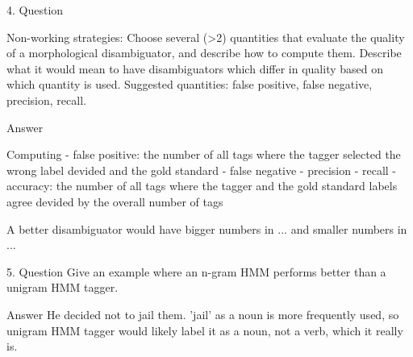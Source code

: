  
 4. Question

Non-working strategies:
Choose several (>2) quantities that evaluate the quality of a morphological disambiguator, and describe how to compute them. Describe what it would mean to have disambiguators which differ in quality based on which quantity is used.
Suggested quantities: false positive, false negative, precision, recall.

Answer

Computing
- false positive: the number of all tags where the tagger selected the wrong label devided and the gold standard
- false negative
- precision
- recall
- accuracy: the number of all tags where the tagger and the gold standard labels agree devided by the overall number of tags 

A better disambiguator would have bigger numbers in ... and smaller numbers in ...

5. Question
Give an example where an n-gram HMM performs better than a unigram HMM tagger.

Answer
He decided not to jail them.
'jail' as a noun is more frequently used, so unigram HMM tagger would likely label it as a noun, not a verb, which it really is. 

